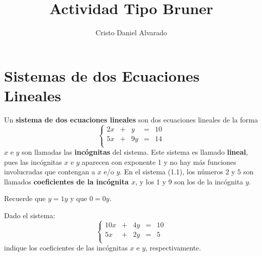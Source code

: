 \documentclass[12pt]{report}
\theoremstyle{largebreak}
\begin{document}
    \setlength{\parskip}{5pt} %
    \setlength{\parindent}{12pt} %
    \title{Actividad Tipo Bruner}
    \author{Cristo Daniel Alvarado}
    \maketitle

    
    \setcounter{chapter}{1}

    \section{Sistemas de dos Ecuaciones Lineales}

    Un \textbf{sistema de dos ecuaciones lineales} son dos ecuaciones lineales de la forma
    \begin{equation}
        \left\{
            \begin{array}{ccccc}
                2x & + & y & = & 10 \\
                5x & + & 9y & = & 14 \\
            \end{array}
        \right.
    \end{equation}
    $x$ e $y$ son llamadas las \textbf{incógnitas} del sistema. Este sistema es llamado \textbf{lineal}, pues las incógnitas $x$ e $y$ aparecen con exponente 1 y no hay más funciones involucradas que contengan a $x$ e/o $y$. En el sistema (1.1), los números $2$ y $5$ son llamados \textbf{coeficientes de la incógnita $x$}, y los 1 y 9 son los de la incógnita $y$.

    \begin{obs}
        Recuerde que $y=1y$ y que $0=0y$.
    \end{obs}

    \begin{excer}
        Dado el sistema:
        \begin{equation*}
            \left\{
                \begin{array}{ccccc}
                    10x & + & 4y & = & 10 \\
                    5x & + & 2y & = & 5 \\
                \end{array}
            \right.
        \end{equation*}
        indique los coeficientes de las incógnitas $x$ e $y$, respectivamente.
    \end{excer}
\end{document}
